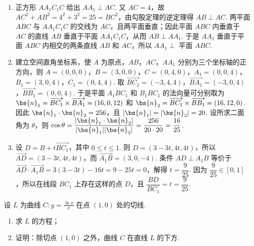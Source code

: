 \begin{solution}
\begin{enumerate}
\item 正方形 \(AA_{1}C_{1}C\) 给出 \(AA_{1}\perp AC\). 又 \(AC=4\)，故
\(AC^2+AB^2=4^2+3^2=25=BC^2\)，由勾股定理的逆定理得 \(AB\perp AC\). 两平面 \(ABC\) 与 \(AA_{1}C_{1}C\) 的交线为 \(AC\)，且两平面垂直；因此平面 \(ABC\) 内垂直于 \(AC\) 的直线 \(AB\) 垂直于平面 \(AA_{1}C_{1}C\)，从而 \(AB\perp AA_{1}\). 于是 \(AA_{1}\) 垂直于平面 \(ABC\) 内相交的两条直线 \(AB\) 和 \(AC\)，所以 \(AA_{1}\perp\) 平面 \(ABC\).

\item 建立空间直角坐标系，使 \(A\) 为原点，\(AB\)，\(AC\)，\(AA_{1}\) 分别为三个坐标轴的正方向，则
\(A=(0,0,0)\)，\(B=(3,0,0)\)，\(C=(0,4,0)\)，\(A_{1}=(0,0,4)\)，\(B_{1}=(3,0,4)\)，\(C_{1}=(0,4,4)\). 取
\(\overrightarrow{BC_{1}}=(-3,4,4)\)，\(\overrightarrow{BA_{1}}=(-3,0,4)\)，\(\overrightarrow{BB_{1}}=(0,0,4)\). 于是平面 \(A_{1}BC_{1}\) 和 \(B_{1}BC_{1}\) 的法向量可分别取为
\(\bs{n}_{1}=\overrightarrow{BC_{1}}\times\overrightarrow{BA_{1}}=(16,0,12)\) 和
\(\bs{n}_{2}=\overrightarrow{BC_{1}}\times\overrightarrow{BB_{1}}=(16,12,0)\). 因此
\(\bs{n}_{1}\cdot\bs{n}_{2}=256\)，且 \(\lvert\bs{n}_{1}\rvert=\lvert\bs{n}_{2}\rvert=20\). 设所求二面角为 \(\theta\)，则
\(\cos\theta=\dfrac{\lvert\bs{n}_{1}\cdot\bs{n}_{2}\rvert}{\lvert\bs{n}_{1}\rvert\lvert\bs{n}_{2}\rvert}=\dfrac{256}{20\cdot20}=\dfrac{16}{25}\).

\item 设 \(D=B+t\overrightarrow{BC_{1}}\)，其中 \(0\leqslant t\leqslant1\). 则
\(D=(3-3t,4t,4t)\)，所以 \(\overrightarrow{AD}=(3-3t,4t,4t)\)，而 \(\overrightarrow{A_{1}B}=(3,0,-4)\). 条件 \(AD\perp A_{1}B\) 等价于
\(\overrightarrow{AD}\cdot\overrightarrow{A_{1}B}=3(3-3t)-16t=9-25t=0\)，解得 \(t=\dfrac9{25}\). 因为 \(\dfrac9{25}\in[0,1]\)，所以在线段 \(BC_{1}\) 上存在这样的点 \(D\)，且
\(\dfrac{BD}{BC_{1}}=t=\dfrac9{25}\).
\end{enumerate}
\end{solution}

\begin{problem}
设 \(L\) 为曲线 \(C: y = \frac{\ln x}{x}\) 在点 \((1,0)\) 处的切线.
\begin{enumerate}
\item 求 \(L\) 的方程；
\item 证明：除切点 \((1,0)\) 之外，曲线 \(C\) 在直线 \(L\) 的下方.
\end{enumerate}
\end{problem}

